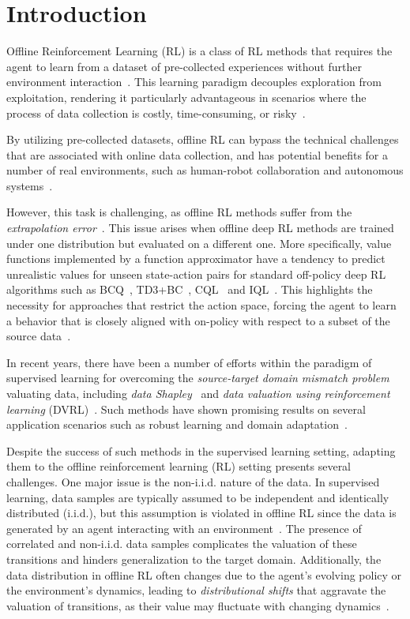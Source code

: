 \section{Introduction}
Offline Reinforcement Learning (RL) is a class of RL methods that requires the agent to learn from a dataset of pre-collected experiences without further environment interaction~\citep{lange2012batch}. This learning paradigm decouples exploration from exploitation, rendering it particularly advantageous in scenarios where the process of data collection is costly, time-consuming, or risky~\citep{isele2018safe,fujimoto2019off}. 

By utilizing pre-collected datasets, offline RL can bypass the technical challenges that are associated with online data collection, and has potential benefits for a number of real environments, such as human-robot collaboration and autonomous systems~\citep{breazeal2008learning,tang2021model}.


However, this task is challenging, as offline RL methods suffer from the \emph{extrapolation error}~\citep{fujimoto2019off,kumar2019stabilizing}. This issue arises when offline deep RL methods are trained under one distribution but evaluated on a different one. More specifically, value functions implemented by a function approximator have a tendency to predict unrealistic values for unseen state-action pairs for standard off-policy deep RL algorithms such as BCQ~\citep{fujimoto2019off}, TD3+BC~\citep{fujimoto2021minimalist}, CQL~\citep{kumar2020conservative} and IQL~\citep{kostrikov2021offline}. This highlights the necessity for approaches that restrict the action space, forcing the agent to learn a behavior that is closely aligned with on-policy with respect to a subset of the source data~\citep{fujimoto2019off}.



In recent years, there have been a number of efforts within the paradigm of supervised learning for overcoming the \emph{source-target domain mismatch problem} valuating data, including \emph{data Shapley}~\citep{ghorbani2019data} and \emph{data valuation using reinforcement learning} (DVRL)~\citep{yoon2020data}. Such methods have shown promising results on several application scenarios such as robust learning and domain adaptation~\citep{yoon2020data}.


Despite the success of such methods in the supervised learning setting, adapting them to the offline reinforcement learning (RL) setting presents several challenges. One major issue is the non-i.i.d. nature of the data. In supervised learning, data samples are typically assumed to be independent and identically distributed (i.i.d.), but this assumption is violated in offline RL since the data is generated by an agent interacting with an environment~\citep{levine2020offline}. The presence of correlated and non-i.i.d. data samples complicates the valuation of these transitions and hinders generalization to the target domain. Additionally, the data distribution in offline RL often changes due to the agent's evolving policy or the environment's dynamics, leading to \emph{distributional shifts} that aggravate the valuation of transitions, as their value may fluctuate with changing dynamics~\citep{kumar2019stabilizing,kumar2020conservative}. 

